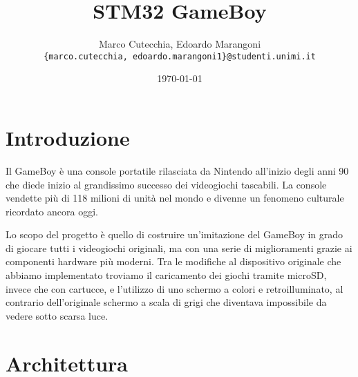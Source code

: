 \documentclass[12pt]{article}
\title{STM32 GameBoy}
\date{\today}
\author{Marco Cutecchia, Edoardo Marangoni \\
\footnotesize \texttt{\{marco.cutecchia, edoardo.marangoni1\}@studenti.unimi.it} \\ }
\begin{document}
\maketitle

\section{Introduzione}
Il GameBoy è una console portatile rilasciata da Nintendo all'inizio degli anni
90 che diede inizio al grandissimo successo dei videogiochi tascabili.
La console vendette più di 118 milioni di unità nel mondo e divenne un fenomeno
culturale ricordato ancora oggi.

Lo scopo del progetto è quello di costruire un'imitazione del GameBoy in grado
di giocare tutti i videogiochi originali, ma con una serie di miglioramenti
grazie ai componenti hardware più moderni. Tra le modifiche al dispositivo
originale che abbiamo implementato troviamo il caricamento dei giochi tramite
microSD, invece che con cartucce, e l'utilizzo di uno schermo a colori e
retroilluminato, al contrario dell'originale schermo a scala di grigi che
diventava impossibile da vedere sotto scarsa luce.

\section{Architettura}
\end{document}
